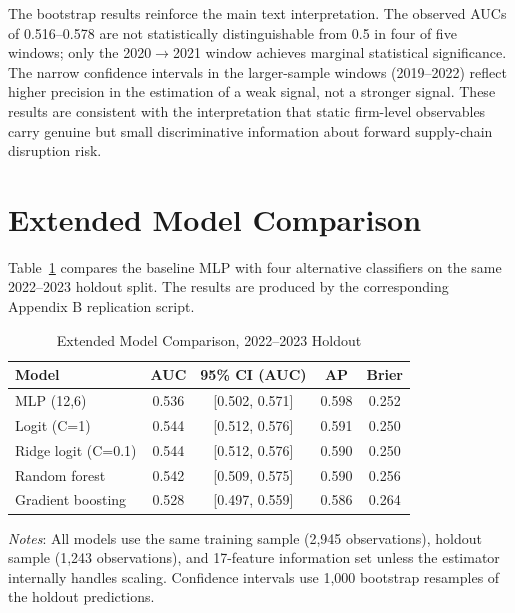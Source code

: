 \documentclass[12pt]{article}
\begin{document}
The bootstrap results reinforce the main text interpretation.  The observed
AUCs of 0.516--0.578 are not statistically distinguishable from 0.5 in four
of five windows; only the 2020$\to$2021 window achieves marginal statistical
significance.  The narrow confidence intervals in the larger-sample windows
(2019--2022) reflect higher precision in the estimation of a weak signal, not
a stronger signal.  These results are consistent with the interpretation that
static firm-level observables carry genuine but small discriminative
information about forward supply-chain disruption risk.

\section{Extended Model Comparison}\label{app:model}

Table~\ref{tab:appendix_model} compares the baseline MLP with four alternative
classifiers on the same 2022--2023 holdout split.  The results are produced by
the corresponding Appendix B replication script.

\begin{table}[H]
\centering
\caption{Extended Model Comparison, 2022--2023 Holdout}\label{tab:appendix_model}
\begin{threeparttable}
\small
\begin{tabular}{lcccc}
\toprule
Model & AUC & 95\% CI (AUC) & AP & Brier \\
\midrule
MLP (12,6)          & 0.536 & {[0.502, 0.571]} & 0.598 & 0.252 \\
Logit (C=1)         & 0.544 & {[0.512, 0.576]} & 0.591 & 0.250 \\
Ridge logit (C=0.1) & 0.544 & {[0.512, 0.576]} & 0.590 & 0.250 \\
Random forest       & 0.542 & {[0.509, 0.575]} & 0.590 & 0.256 \\
Gradient boosting   & 0.528 & {[0.497, 0.559]} & 0.586 & 0.264 \\
\bottomrule
\end{tabular}
\begin{tablenotes}
  \small
  \item \textit{Notes}: All models use the same training sample
  (2,945 observations), holdout sample (1,243 observations), and 17-feature
  information set unless the estimator internally handles scaling.  Confidence
  intervals use 1,000 bootstrap resamples of the holdout predictions.
\end{tablenotes}
\end{threeparttable}
\end{table}
\end{document}
